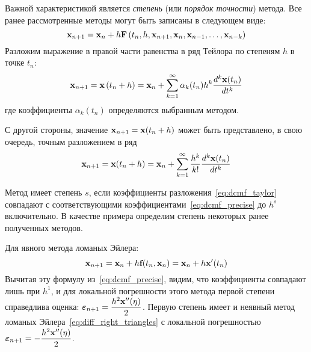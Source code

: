 \documentclass[../../calc-math-exam-2023.tex]{subfiles}
\begin{document}
    Важной характеристикой является \emph{степень} (или \emph{порядок точности}) метода. Все ранее рассмотренные методы
    могут быть записаны в следующем виде:
    \begin{equation}
        \bf{x}_{n+1} = \bf{x}_n + h\bf{F}\left( t_n, h, \bf{x}_{n+1}, \bf{x}_n, \bf{x}_{n-1}, \ldots, \bf{x}_{n - k} \right) \label{eq:diff_common_method_form}
    \end{equation}
    Разложим выражение в правой части равенства в ряд Тейлора по степеням $h$ в точке $t_n$:
    \begin{equation}
        \bf{x}_{n+1} = \bf{x}\left( t_n + h \right) = \bf{x}_n + \sum_{k=1}^{\infty} \alpha_k(t_n) h^k \frac{d^k \bf{x}(t_n)}{dt^k} \label{eq:dcmf_taylor}
    \end{equation}
    где коэффициенты $\alpha_k(t_n)$ определяются выбранным методом.

    С другой стороны, значение $\bf{x}_{n+1} = \bf{x}(t_n + h)$ может быть представлено, в свою очередь, точным разложением
    в ряд
    \begin{equation}
        \bf{x}_{n+1} = \bf{x}(t_n + h) = \bf{x}_n + \sum_{k=1}^{\infty} \frac{h^k}{k!} \frac{d^k\bf{x}(t_n)}{dt^k} \label{eq:dcmf_precise}
    \end{equation}

    Метод имеет степень $s$, если коэффициенты разложения~\eqref{eq:dcmf_taylor} совпадают с соответствующими
    коэффициентами~\eqref{eq:dcmf_precise} до $h^s$ включительно. В качестве примера определим степень некоторых ранее
    полученных методов.

    Для явного метода ломаных Эйлера:
    \begin{equation*}
        \bf{x}_{n+1} = \bf{x}_n + h\bf{f}(t_n, \bf{x}_n) = \bf{x}_n + h\bf{x}'(t_n)
    \end{equation*}
    Вычитая эту формулу из~\eqref{eq:dcmf_precise}, видим, что коэффициенты совпадают лишь при $h^1$, и для локальной
    погрешности этого метода первой степени справедлива оценка: $\displaystyle \bm{\varepsilon}_{n+1} = \frac{h^2 \bf{x}''(\eta)}{2}$.
    Первую степень имеет и неявный метод ломаных Эйлера~\eqref{eq:diff_right_triangles} с локальной погрешностью
    $\displaystyle \bm{\varepsilon}_{n+1} = - \frac{h^2 \bf{x}''(\eta)}{2}$.
\end{document}
